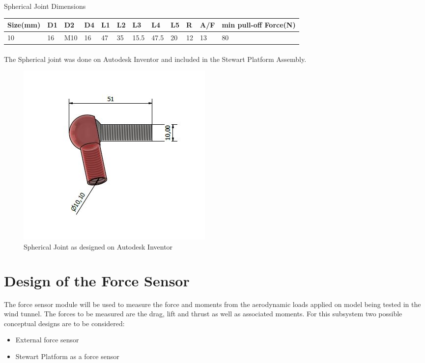 \begin{table}[!h]
\caption{Spherical Joint Dimensions}
\end{table}
\begin{tabular}{|l|l|l|l|l|l|l|l|l|l|l|l|}
\hline
\textbf{Size(mm)}& \textbf{D1}& \textbf{D2}&\textbf{ D4}& \textbf{L1}& \textbf{L2}& \textbf{L3}& \textbf{L4}& \textbf{L5}& \textbf{R} & \textbf{A/F} & \textbf{min pull-off Force(N)}\\
\hline
10 & 16 & M10 & 16 & 47 & 35 & 15.5 & 47.5& 20 & 12 & 13 & 80\\
\hline
\end{tabular}

\paragraph{}

The Spherical joint was done on Autodesk Inventor and included in the Stewart Platform Assembly.
\begin{center}
	\begin{figure}[!h]
	\centering
	\includegraphics[width=0.5\linewidth]{Figures/Spherical CAD}
	\caption[Spherical Joint CAD]{Spherical Joint as designed on Autodesk Inventor}
	\end{figure}
\end{center}

\section{Design of the Force Sensor}
The force sensor module will be used to measure the force and moments from the aerodynamic loads applied on model being tested in the wind tunnel. The forces to be measured are the drag, lift and thrust as well as associated moments. For this subsystem two possible conceptual designs are to be considered:
\begin{itemize}
\item External force sensor
\item Stewart Platform as a force sensor
\end{itemize}
